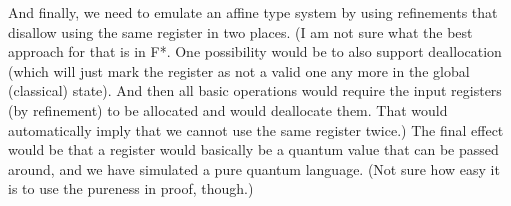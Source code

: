 \documentclass[a4paper]{article}
\begin{document}
\begin{itemize}
  And finally, we need to emulate an affine type system by using refinements that disallow using the same register in two places.
  (I am not sure what the best approach for that is in F*.
  One possibility would be to also support deallocation (which will just mark the register as not a valid one any more in the global (classical) state). And then all basic operations would require the input registers (by refinement) to be allocated and would deallocate them. That would automatically imply that we cannot use the same register twice.)
  The final effect would be that a register would basically be a quantum value that can be passed around, and we have simulated a pure quantum language. (Not sure how easy it is to use the pureness in proof, though.)
\end{itemize}





  
\end{document}
